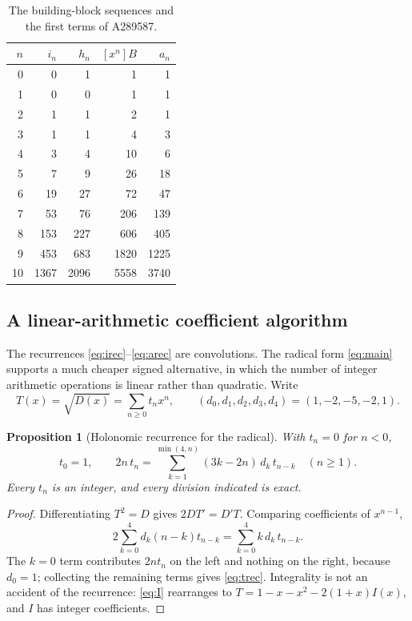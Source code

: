 \documentclass[11pt,letterpaper]{article}
\numberwithin{equation}{section}
\newtheorem{proposition}[theorem]{Proposition}
\theoremstyle{definition}
\newcommand{\coeff}[2]{[#1^{#2}]}
\begin{document}
\begin{table}[ht]
\centering
\caption{The building-block sequences and the first terms of A289587.}
\begin{tabular}{r r r r r}
\toprule
$n$ & $i_n$ & $h_n$ & $\coeff{x}{n}B$ & $a_n$\\
\midrule
0&0&1&1&1\\
1&0&0&1&1\\
2&1&1&2&1\\
3&1&1&4&3\\
4&3&4&10&6\\
5&7&9&26&18\\
6&19&27&72&47\\
7&53&76&206&139\\
8&153&227&606&405\\
9&453&683&1820&1225\\
10&1367&2096&5558&3740\\
\bottomrule
\end{tabular}
\label{tab:coeffs}
\end{table}

\subsection{A linear-arithmetic coefficient algorithm}
\label{sec:linear}

The recurrences \eqref{eq:irec}--\eqref{eq:arec} are convolutions. The
radical form \eqref{eq:main} supports a much cheaper signed alternative,
in which the number of integer arithmetic operations is linear rather
than quadratic. Write
\[
 T(x)=\sqrt{D(x)}=\sum_{n\ge0}t_nx^n,
 \qquad (d_0,d_1,d_2,d_3,d_4)=(1,-2,-5,-2,1).
\]

\begin{proposition}[Holonomic recurrence for the radical]
\label{prop:trec}
With $t_n=0$ for $n<0$,
\begin{equation}
 \boxed{\displaystyle
 t_0=1,\qquad
 2n\,t_n=\sum_{k=1}^{\min(4,n)}(3k-2n)\,d_k\,t_{n-k}
 \quad(n\ge1).}
 \label{eq:trec}
\end{equation}
Every $t_n$ is an integer, and every division indicated is exact.
\end{proposition}
\begin{proof}
Differentiating $T^2=D$ gives $2DT'=D'T$. Comparing coefficients of
$x^{n-1}$,
\[
 2\sum_{k=0}^4 d_k(n-k)t_{n-k}=\sum_{k=0}^4 k\,d_k\,t_{n-k}.
\]
The $k=0$ term contributes $2nt_n$ on the left and nothing on the right,
because $d_0=1$; collecting the remaining terms gives \eqref{eq:trec}.
Integrality is not an accident of the recurrence: \eqref{eq:I} rearranges
to $T=1-x-x^2-2(1+x)I(x)$, and $I$ has integer coefficients.
\end{proof}
\end{document}
